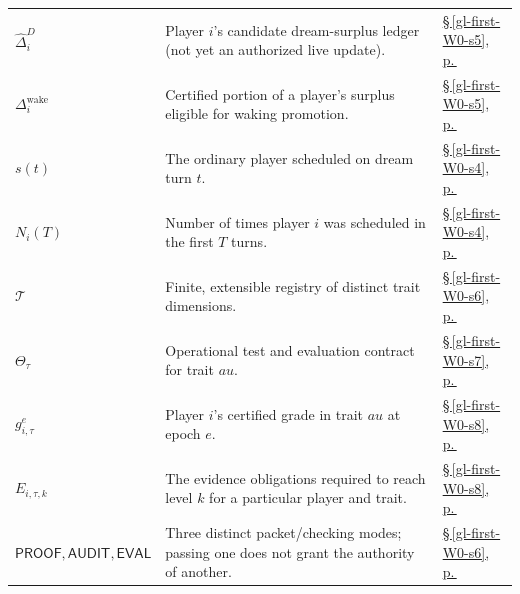 \documentclass[11pt,letterpaper]{article}
\theoremstyle{definition}
\theoremstyle{plain}
\theoremstyle{definition}
\begin{document}
\begin{longtable}{@{}>{\raggedright\arraybackslash}p{.215\linewidth}>{\raggedright\arraybackslash}p{.585\linewidth}>{\raggedright\arraybackslash}p{.14\linewidth}@{}}
\textbf{$\widehat\Delta_i^D$} & Player $i$'s candidate dream-surplus ledger (not yet an authorized live update). & \hyperref[gl-first-W0-s5]{\S\,\ref*{gl-first-W0-s5}, p.\,\pageref*{gl-first-W0-s5}} \\
\textbf{$\Delta_i^{\mathrm{wake}}$} & Certified portion of a player's surplus eligible for waking promotion. & \hyperref[gl-first-W0-s5]{\S\,\ref*{gl-first-W0-s5}, p.\,\pageref*{gl-first-W0-s5}} \\
\textbf{$s(t)$} & The ordinary player scheduled on dream turn $t$. & \hyperref[gl-first-W0-s4]{\S\,\ref*{gl-first-W0-s4}, p.\,\pageref*{gl-first-W0-s4}} \\
\textbf{$N_i(T)$} & Number of times player $i$ was scheduled in the first $T$ turns. & \hyperref[gl-first-W0-s4]{\S\,\ref*{gl-first-W0-s4}, p.\,\pageref*{gl-first-W0-s4}} \\
\textbf{$\mathcal T$} & Finite, extensible registry of distinct trait dimensions. & \hyperref[gl-first-W0-s6]{\S\,\ref*{gl-first-W0-s6}, p.\,\pageref*{gl-first-W0-s6}} \\
\textbf{$\Theta_\tau$} & Operational test and evaluation contract for trait $	au$. & \hyperref[gl-first-W0-s7]{\S\,\ref*{gl-first-W0-s7}, p.\,\pageref*{gl-first-W0-s7}} \\
\textbf{$g_{i,\tau}^e$} & Player $i$'s certified grade in trait $	au$ at epoch $e$. & \hyperref[gl-first-W0-s8]{\S\,\ref*{gl-first-W0-s8}, p.\,\pageref*{gl-first-W0-s8}} \\
\textbf{$E_{i,\tau,k}$} & The evidence obligations required to reach level $k$ for a particular player and trait. & \hyperref[gl-first-W0-s8]{\S\,\ref*{gl-first-W0-s8}, p.\,\pageref*{gl-first-W0-s8}} \\
\textbf{$\mathsf{PROOF},\mathsf{AUDIT},\mathsf{EVAL}$} & Three distinct packet/checking modes; passing one does not grant the authority of another. & \hyperref[gl-first-W0-s6]{\S\,\ref*{gl-first-W0-s6}, p.\,\pageref*{gl-first-W0-s6}} \\
\end{longtable}\endgroup
\clearpage
\end{document}
